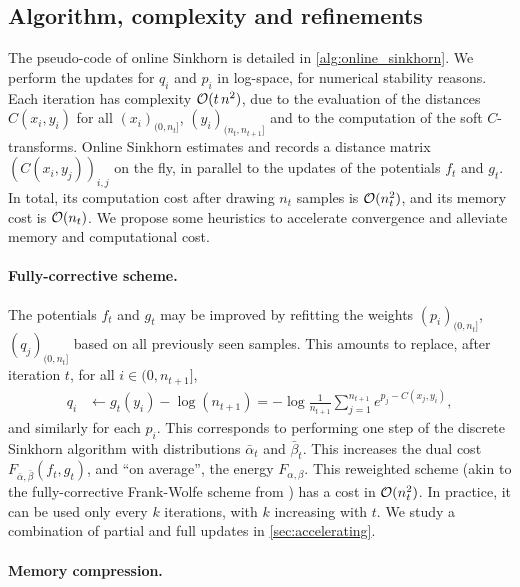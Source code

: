 \subsection{Algorithm, complexity and refinements}\label{sec:alg}

The pseudo-code of online Sinkhorn is detailed in \autoref{alg:online_sinkhorn}.
We perform the updates for $q_i$ and $p_i$ in log-space, for numerical stability reasons.
Each iteration has complexity $\mathcal{O}(t\,n^2)$, due to the evaluation of the
distances $C(x_i, y_i)$ for all $(x_i)_{(0, n_t]}$, $(y_i)_{(n_t, n_{t+1}]}$
and to the computation of the
soft $C$-transforms. Online Sinkhorn estimates and records a distance matrix
$(C(x_i,y_j))_{i,j}$ on the fly, in parallel to the updates of the potentials
$f_t$ and $g_t$. In total, its computation cost after drawing $n_t$ samples is
$\mathcal{O}(n_t^2)$, and its memory cost is $\mathcal{O}(n_t)$.
%
We propose some heuristics to accelerate convergence and alleviate memory and computational cost.


\paragraph{Fully-corrective scheme.} 

The potentials $f_t$ and $g_t$ may be
improved by refitting the weights $(p_i)_{(0, n_t]}$, $(q_j)_{(0, n_t]}$ based
on all previously seen samples. This
amounts to replace, after iteration $t$, for all $i \in (0, n_{t+1}]$,
\begin{align}
    q_i &\gets g_t(y_i) - \log(n_{t+1}) 
    = - \log \frac{1}{n_{t+1}} 
    \sum_{j=1}^{n_{t+1}} e^{p_j - C(x_j, y_i)},
\end{align}
and similarly for each $p_i$. This corresponds to performing one step of the
 discrete Sinkhorn algorithm with distributions $\bar \alpha_t$ and $\bar
 \beta_t$. This increases the dual cost $F_{ \bar \alpha, \bar \beta}(f_t, g_t)$,
 and ``on average'', the energy $F_{\alpha, \beta}$. This reweighted scheme (akin to
 the fully-corrective Frank-Wolfe scheme from \citet{lacoste2015global}) has a cost in
 $\mathcal{O}(n_t^2)$. In practice, it can be used only every $k$ iterations, with $k$
 increasing with $t$. We study a combination of partial and full updates in
 \autoref{sec:accelerating}.

\paragraph{Memory compression.} 

